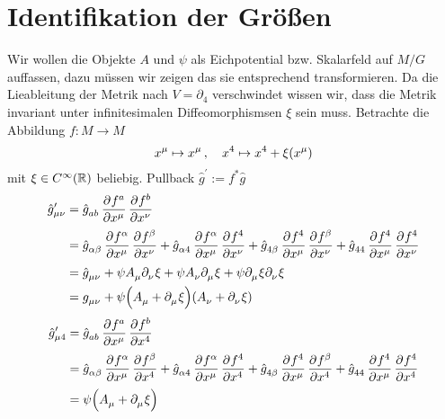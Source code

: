 \section{Identifikation der Größen}
Wir wollen die Objekte $A$ und $\psi$ als Eichpotential bzw. Skalarfeld auf $M/G$
auffassen, dazu müssen wir zeigen das sie entsprechend transformieren.
Da die Lieableitung der Metrik nach $V=\partial_4$ verschwindet wissen wir, dass die
Metrik invariant unter infinitesimalen Diffeomorphismsen $\xi$ sein muss.
Betrachte die Abbildung $f:M\to M$ 
\begin{equation}
\tensor{x}{^\mu}\mapsto
\tensor{x}{^\mu}\,,\quad\tensor{x}{^4}\mapsto\tensor{x}{^4}+
\xi\left(\tensor{x}{^\mu}\right)
\end{equation}
mit $\xi\in C^\infty\left(\Reals\right)$ beliebig. 
Pullback $\hat{g}^\prime:=f^*\hat{g}$
\begin{equation}
\begin{split}
\tensor*{\hat{g}}{*^\prime_\mu_\nu}&=\tensor{\hat{g}}{_a_b}\dpd{f^a}{\tensor{x}{^\mu}}\dpd{f^b}{\tensor{x}{^\nu}}\\
&=\tensor{\hat{g}}{_\alpha_\beta}\dpd{f^\alpha}{\tensor{x}{^\mu}}\dpd{f^\beta}{\tensor{x}{^\nu}}
+\tensor{\hat{g}}{_\alpha_4}\dpd{f^\alpha}{\tensor{x}{^\mu}}\dpd{f^4}{\tensor{x}{^\nu}}
+\tensor{\hat{g}}{_4_\beta}\dpd{f^4}{\tensor{x}{^\mu}}\dpd{f^\beta}{\tensor{x}{^\nu}}
+\tensor{\hat{g}}{_4_4}\dpd{f^4}{\tensor{x}{^\mu}}\dpd{f^4}{\tensor{x}{^\nu}}
\\
&=\tensor{\hat{g}}{_\mu_\nu}
+\psi\tensor{A}{_\mu}\pdif{_\nu}\xi
+\psi\tensor{A}{_\nu}\pdif{_\mu}\xi
+\psi\pdif{_\mu}\xi\pdif{_\nu}\xi\\
&=\tensor{g}{_\mu_\nu}
+\psi\left(\tensor{A}{_\mu}+\pdif{_\mu}\xi\right)
\left(\tensor{A}{_\nu}+\pdif{_\nu}\xi\right)
\end{split}
\end{equation}
\begin{equation}
\begin{split}
\tensor*{\hat{g}}{*^\prime_\mu_4}&=\tensor{\hat{g}}{_a_b}\dpd{f^a}{\tensor{x}{^\mu}}\dpd{f^b}{\tensor{x}{^4}}\\
&=\tensor{\hat{g}}{_\alpha_\beta}\dpd{f^\alpha}{\tensor{x}{^\mu}}\dpd{f^\beta}{\tensor{x}{^4}}
+\tensor{\hat{g}}{_\alpha_4}\dpd{f^\alpha}{\tensor{x}{^\mu}}\dpd{f^4}{\tensor{x}{^4}}
+\tensor{\hat{g}}{_4_\beta}\dpd{f^4}{\tensor{x}{^\mu}}\dpd{f^\beta}{\tensor{x}{^4}}
+\tensor{\hat{g}}{_4_4}\dpd{f^4}{\tensor{x}{^\mu}}\dpd{f^4}{\tensor{x}{^4}}\\
&=\psi\left(\tensor{A}{_\mu}+\pdif{_\mu}\xi\right)
\end{split}
\end{equation}
